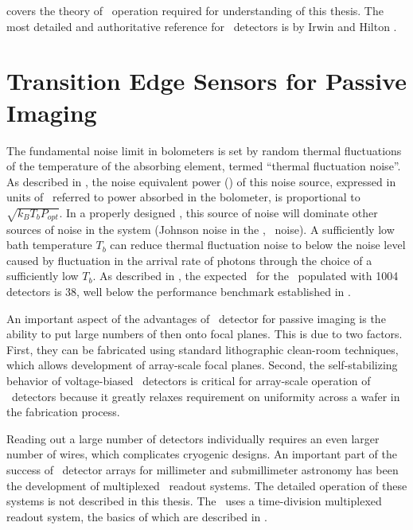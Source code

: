  covers the theory of \TES\ operation required for understanding of this thesis.
The most detailed and authoritative reference for \TES\ detectors is by Irwin and Hilton \cite{irwin_transition-edge_2005}.

\section{Transition Edge Sensors for Passive Imaging}

The fundamental noise limit in bolometers is set by random thermal fluctuations of the temperature of the absorbing element, termed ``thermal fluctuation noise''.
As described in , the noise equivalent power (\NEP) of this noise source, expressed in units of \pnoise\ referred to power absorbed in the bolometer, is proportional to $\sqrt{k_B T_b P_{opt}}$.
In a properly designed \TES, this source of noise will dominate other sources of noise in the system (Johnson noise in the \TES, \SQUID\ noise).
A sufficiently low bath temperature $T_b$ can reduce thermal fluctuation noise to below the noise level caused by fluctuation in the arrival rate of photons through the choice of a sufficiently low $T_b$.
As described in , the expected \NETD\ for the \Imager\ populated with 1004 detectors is \SI{38}{\mK}, well below the performance benchmark established in .

An important aspect of the advantages of \TES\ detector for passive imaging is the ability to put large numbers of then onto focal planes.
This is due to two factors.
First, they can be fabricated using standard lithographic clean-room techniques, which allows development of array-scale focal planes.
Second, the self-stabilizing behavior of voltage-biased \TES\ detectors is critical for array-scale operation of \TES\ detectors because it greatly relaxes requirement on uniformity across a wafer in the fabrication process.

Reading out a large number of detectors individually requires an even larger number of wires, which complicates cryogenic designs.
An important part of the success of \TES\ detector arrays for millimeter and submillimeter astronomy has been the development of multiplexed \SQUID\ readout systems.
The detailed operation of these systems is not described in this thesis.
The \Imager\ uses a time-division multiplexed readout system, the basics of which are described in .
 

